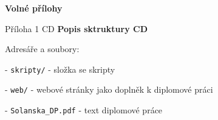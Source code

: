 \documentclass{thesisKGI}
\begin{document}
    \newpage
    \begin{prilohy}
      \textbf{Volné přílohy}

      Příloha 1 CD \newline
      \newline
      \textbf{Popis sktruktury CD}

        Adresáře a soubory:

        - \texttt{skripty\slash} - složka se skripty

        - \texttt{web\slash} - webové stránky jako doplněk k diplomové práci

        - \texttt{Solanska\_DP.pdf} - text diplomové práce

      \vspace*{\fill}
  \end{prilohy}
      
  
\end{document}

